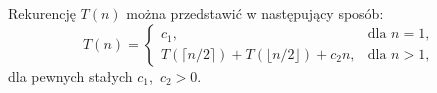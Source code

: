 \subsection{} %
Rekurencję $T(n)$ można przedstawić w następujący sposób:
\[
	T(n) =
	\begin{cases}
		c_1, & \text{dla $n=1$}, \\
		T(\lceil n/2\rceil)+T(\lfloor n/2\rfloor)+c_2n, & \text{dla $n>1$},
	\end{cases}
\]
dla pewnych stałych $c_1$,~$c_2>0$.
% 
% 

